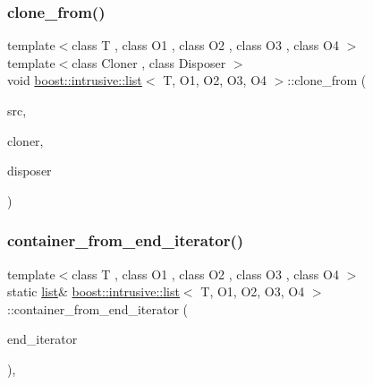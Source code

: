 \mbox{\label{classboost_1_1intrusive_1_1list_a385d08ac3e61f67a63671ec827f39a39}} 
\subsubsection{\texorpdfstring{clone\+\_\+from()}{clone\_from()}\hspace{0.1cm}{\footnotesize\ttfamily [2/2]}}
{\footnotesize\ttfamily template$<$class T , class O1 , class O2 , class O3 , class O4 $>$ \\
template$<$class Cloner , class Disposer $>$ \\
void \hyperlink{classboost_1_1intrusive_1_1list}{boost\+::intrusive\+::list}$<$ T, O1, O2, O3, O4 $>$\+::clone\+\_\+from (\begin{DoxyParamCaption}\item[{B\+O\+O\+S\+T\+\_\+\+R\+V\+\_\+\+R\+EF(\hyperlink{classboost_1_1intrusive_1_1list}{list}$<$ T, O1, O2, O3, O4 $>$)}]{src,  }\item[{Cloner}]{cloner,  }\item[{Disposer}]{disposer }\end{DoxyParamCaption})\hspace{0.3cm}{\ttfamily [inline]}}

\mbox{\label{classboost_1_1intrusive_1_1list_a2ae036a74c66652d8552e1d76abdad31}} 
\subsubsection{\texorpdfstring{container\+\_\+from\+\_\+end\+\_\+iterator()}{container\_from\_end\_iterator()}\hspace{0.1cm}{\footnotesize\ttfamily [1/2]}}
{\footnotesize\ttfamily template$<$class T , class O1 , class O2 , class O3 , class O4 $>$ \\
static \hyperlink{classboost_1_1intrusive_1_1list}{list}\& \hyperlink{classboost_1_1intrusive_1_1list}{boost\+::intrusive\+::list}$<$ T, O1, O2, O3, O4 $>$\+::container\+\_\+from\+\_\+end\+\_\+iterator (\begin{DoxyParamCaption}\item[{\hyperlink{classboost_1_1intrusive_1_1list_a3b53513ff4e214951fc767223097fb6e}{iterator}}]{end\+\_\+iterator }\end{DoxyParamCaption})\hspace{0.3cm}{\ttfamily [inline]}, {\ttfamily [static]}}

